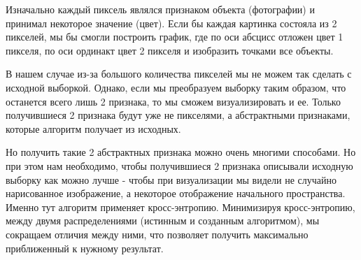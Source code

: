 \begin{itemize}
Изначально каждый пиксель являлся признаком объекта (фотографии) и принимал некоторое значение (цвет). Если бы каждая картинка состояла из 2 пикселей, мы бы смогли построить график, где по оси абсцисс отложен цвет 1 пикселя, по оси ординакт цвет 2 пикселя и изобразить точками все объекты.

В нашем случае из-за большого количества пикселей мы не можем так сделать с исходной выборкой. Однако, если мы преобразуем выборку таким образом, что останется всего лишь 2 признака, то мы сможем визуализировать и ее. Только получившиеся 2 признака будут уже не пикселями, а абстрактными признаками, которые алгоритм получает из исходных.

Но получить такие 2 абстрактных признака можно очень многими способами. Но при этом нам необходимо, чтобы получившиеся 2 признака описывали исходную выборку как можно лучше - чтобы при визуализации мы видели не случайно нарисованное изображение, а некоторое отображение начального пространства. Именно тут алгоритм применяет кросс-энтропию. Минимизируя кросс-энтропию, между двумя распределениями (истинным и созданным алгоритмом), мы сокращаем отличия между ними, что позволяет получить максимально приближенный к нужному результат.
\end{itemize}